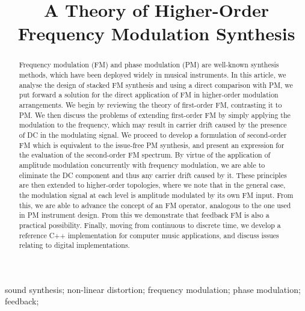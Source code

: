 \documentclass[]{interact}
\begin{document}

\title{A Theory of Higher-Order Frequency Modulation Synthesis}


\author{
}

\maketitle
\begin{abstract}
Frequency modulation (FM) and phase modulation (PM) are well-known synthesis methods, which have been deployed widely in musical instruments. In this article, we analyse the design of stacked FM synthesis and using a direct comparison with PM, we put forward a solution for the direct application of FM in higher-order modulation arrangements. We begin by reviewing the theory of first-order FM, contrasting it to PM. We then discuss the problems of extending first-order FM by
simply applying the modulation to the frequency, which may result in carrier drift caused by the
presence of DC in the modulating signal. We proceed to develop a formulation of second-order FM which is equivalent to the issue-free PM synthesis, and present an expression for the evaluation of the second-order FM spectrum. By virtue of the application of amplitude modulation concurrently with frequency modulation, we are able to eliminate the DC component and thus any carrier drift caused by it. These principles are then extended to higher-order topologies, 
where we note that in the general case, the modulation signal at each level is amplitude modulated by its own FM input. From this, we are able to advance the concept of an FM operator, analogous to the one used in PM instrument design. From this we demonstrate that feedback FM is also a practical possibility. Finally, moving from continuous to discrete time, we develop a reference C++ implementation for computer music applications, and discuss issues relating to digital implementations.
\end{abstract}

\begin{keywords}
sound synthesis; non-linear distortion; frequency modulation; phase modulation; feedback;
\end{keywords}
\end{document}
